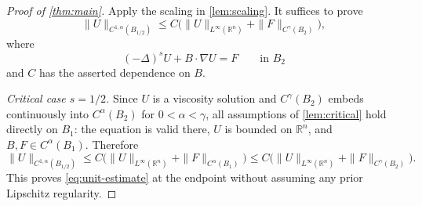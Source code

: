 \documentclass[10pt,a4paper]{amsart}
\numberwithin{equation}{section}
\newcommand{\R}{\mathbb R}
\begin{document}
\begin{proof}[Proof of \cref{thm:main}]
Apply the scaling in \cref{lem:scaling}.  It suffices to prove
\begin{equation}\label{eq:unit-estimate}
 \|U\|_{C^{1,\alpha}(B_{1/2})}
 \le C\bigl(\|U\|_{L^\infty(\R^n)}+\|F\|_{C^\gamma(B_2)}\bigr),
\end{equation}
where
\[
 (-\Delta)^sU+B\cdot\nabla U=F\qquad\text{in }B_2
\]
and $C$ has the asserted dependence on $B$.

\smallskip
\noindent\emph{Critical case $s=1/2$.}
Since $U$ is a viscosity solution and $C^\gamma(B_2)$ embeds continuously
into $C^\alpha(B_2)$ for $0<\alpha<\gamma$, all assumptions of
\cref{lem:critical} hold directly on $B_1$: the equation is valid there,
$U$ is bounded on $\R^n$, and $B,F\in C^\alpha(B_1)$.  Therefore
\[
 \|U\|_{C^{1,\alpha}(B_{1/2})}
 \le C\bigl(\|U\|_{L^\infty(\R^n)}
             +\|F\|_{C^\alpha(B_1)}\bigr)
 \le C\bigl(\|U\|_{L^\infty(\R^n)}
             +\|F\|_{C^\gamma(B_2)}\bigr).
\]
This proves \eqref{eq:unit-estimate} at the endpoint without assuming any
prior Lipschitz regularity.


\end{proof}
\end{document}
